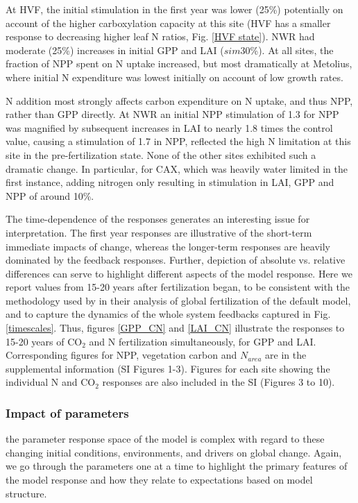 \usepackage{}\documentclass[draft,linenumbers]{agujournal}
\begin{document}
 At HVF, the initial stimulation in the first year was lower (25\%) potentially on account of the higher carboxylation capacity at this site (HVF has a smaller response to decreasing higher leaf N ratios, Fig. \ref{HVF state}). NWR had moderate (25\%) increases in initial GPP and LAI ($sim$30\%).  At all sites, the fraction of NPP spent on N uptake increased, but most dramatically at Metolius, where initial N expenditure was lowest initially on account of low growth rates. 
 
N addition most strongly affects carbon expenditure on N uptake, and thus NPP, rather than GPP directly. At NWR an initial NPP stimulation of 1.3 for NPP was magnified by subsequent increases in LAI to nearly 1.8 times the control value, causing a stimulation of 1.7 in NPP, reflected the high N limitation at this site in the pre-fertilization state. None of the other sites exhibited such a dramatic change. In particular, for CAX, which was heavily water limited in the first instance, adding nitrogen only resulting in stimulation in LAI, GPP and NPP of around 10\%. 

The time-dependence of the responses generates an interesting issue for interpretation. The first year responses are illustrative of the short-term immediate impacts of change, whereas the longer-term responses are heavily dominated by the feedback responses. Further, depiction of absolute vs. relative differences can serve to highlight different aspects of the model response. Here we report values from 15-20 years after fertilization began, to be consistent with the methodology used by \cite{wieder2019} in their analysis of global fertilization of the default model, and to capture the dynamics of the whole system feedbacks captured in Fig. \ref{timescales}.  Thus, figures \ref{GPP_CN} and \ref{LAI_CN} illustrate the responses to 15-20 years of CO$_{2}$ and N  fertilization simultaneously, for GPP and LAI. Corresponding figures for NPP, vegetation carbon and $N_{area}$ are in the supplemental information (SI Figures 1-3). Figures for each site showing the individual N and CO$_{2}$ responses are also included in the SI (Figures 3 to 10).  

\subsubsection{Impact of parameters}
 the parameter response space of the model is complex with regard to these changing initial conditions, environments, and drivers on global change. Again, we go through the parameters one at a time to highlight the primary features of the model response and how they relate to expectations based on model structure. 
\end{document}
